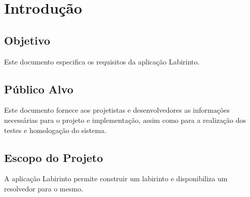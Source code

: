 \chapter{Introdução}

\section{Objetivo}
Este documento especifica os requisitos da aplicação Labirinto.


\section{Público Alvo}
Este documento fornece aos projetistas e desenvolvedores as informações necessárias para o projeto e implementação, assim como para a realização dos testes e homologação do sistema.

\section{Escopo do Projeto}
A aplicação Labirinto permite construir um labirinto e disponibiliza um resolvedor para o mesmo.

